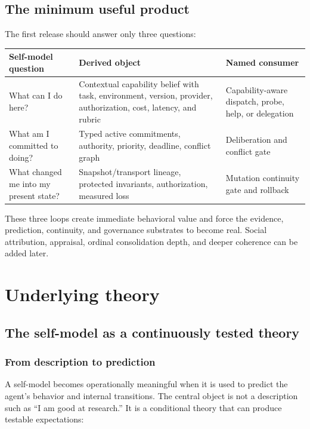 \documentclass[11pt,oneside]{report}
\begin{document}
\chapter{The minimum useful product}

The first release should answer only three questions:

\begin{longtable}{@{}L{1.90in}L{2.25in}L{2.30in}@{}}
\toprule
\textbf{Self-model question} & \textbf{Derived object} & \textbf{Named consumer} \\
\midrule
What can I do here? & Contextual capability belief with task, environment, version, provider, authorization, cost, latency, and rubric & Capability-aware dispatch, probe, help, or delegation \\
What am I committed to doing? & Typed active commitments, authority, priority, deadline, conflict graph & Deliberation and conflict gate \\
What changed me into my present state? & Snapshot/transport lineage, protected invariants, authorization, measured loss & Mutation continuity gate and rollback \\
\bottomrule
\end{longtable}

These three loops create immediate behavioral value and force the evidence, prediction, continuity, and governance substrates to become real. Social attribution, appraisal, ordinal consolidation depth, and deeper coherence can be added later.

\part{Underlying theory}

\chapter{The self-model as a continuously tested theory}

\section{From description to prediction}

A self-model becomes operationally meaningful when it is used to predict the agent's behavior and internal transitions. The central object is not a description such as ``I am good at research.'' It is a conditional theory that can produce testable expectations:
\end{document}
